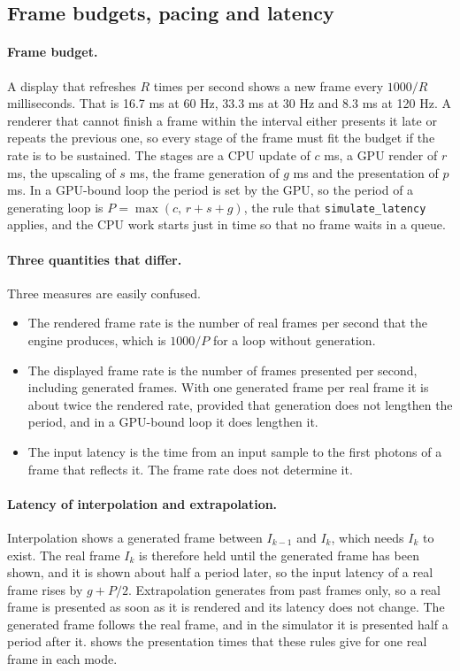 \subsection{Frame budgets, pacing and latency}\label{sec:bg-latency}

\paragraph{Frame budget.} A display that refreshes $R$ times per second shows a new frame every $1000/R$ milliseconds. That is 16.7 ms at 60 Hz, 33.3 ms at 30 Hz and 8.3 ms at 120 Hz. A renderer that cannot finish a frame within the interval either presents it late or repeats the previous one, so every stage of the frame must fit the budget if the rate is to be sustained. The stages are a CPU update of $c$ ms, a GPU render of $r$ ms, the upscaling of $s$ ms, the frame generation of $g$ ms and the presentation of $p$ ms. In a GPU-bound loop the period is set by the GPU, so the period of a generating loop is $P=\max(c,\,r+s+g)$, the rule that \texttt{simulate\_latency} applies, and the CPU work starts just in time so that no frame waits in a queue.

\paragraph{Three quantities that differ.} Three measures are easily confused.
\begin{itemize}
\item The rendered frame rate is the number of real frames per second that the engine produces, which is $1000/P$ for a loop without generation.
\item The displayed frame rate is the number of frames presented per second, including generated frames. With one generated frame per real frame it is about twice the rendered rate, provided that generation does not lengthen the period, and in a GPU-bound loop it does lengthen it.
\item The input latency is the time from an input sample to the first photons of a frame that reflects it. The frame rate does not determine it.
\end{itemize}

\paragraph{Latency of interpolation and extrapolation.} Interpolation shows a generated frame between $I_{k-1}$ and $I_k$, which needs $I_k$ to exist. The real frame $I_k$ is therefore held until the generated frame has been shown, and it is shown about half a period later, so the input latency of a real frame rises by $g+P/2$. Extrapolation generates from past frames only, so a real frame is presented as soon as it is rendered and its latency does not change. The generated frame follows the real frame, and in the simulator it is presented half a period after it.  shows the presentation times that these rules give for one real frame in each mode.

